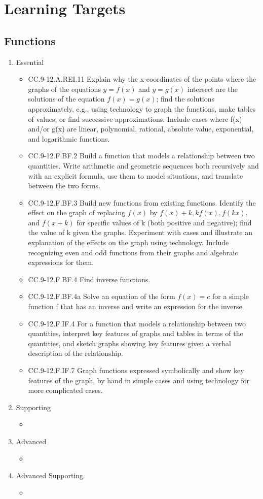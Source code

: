 \documentclass{article}
\begin{document}
\section*{Learning Targets}
\subsection*{Functions}
\begin{enumerate}
	\item Essential
	\begin{itemize}
		\item CC.9-12.A.REI.11  Explain why the x-coordinates of the points where the graphs of the equations $y = f(x)$ and $y = g(x)$ intersect are the solutions of the equation $f(x) = g(x)$; find the solutions approximately, e.g., using technology to graph the functions, make tables of values, or find successive approximations. Include cases where f(x) and/or g(x) are linear, polynomial, rational, absolute value, exponential, and logarithmic functions.
		\item CC.9-12.F.BF.2 Build a function that models a relationship between two quantities. Write arithmetic and geometric sequences both recursively and with an explicit formula, use them to model situations, and translate between the two forms.
		\item CC.9-12.F.BF.3 Build new functions from existing functions. Identify the effect on the graph of replacing $f(x)$ by $f(x) + k, k f(x), f(kx)$, and $f(x + k)$ for specific values of k (both positive and negative); find the value of k given the graphs. Experiment with cases and illustrate an explanation of the effects on the graph using technology. Include recognizing even and odd functions from their graphs and algebraic expressions for them.
		\item CC.9-12.F.BF.4  Find inverse functions. 
		\item CC.9-12.F.BF.4a Solve an equation of the form $f(x) = c$ for a simple function f that has an inverse and write an expression for the inverse. 
		\item CC.9-12.F.IF.4 For a function that models a relationship between two quantities, interpret key features of graphs and tables in terms of the quantities, and sketch graphs showing key features given a verbal description of the relationship. 
		\item CC.9-12.F.IF.7 Graph functions expressed symbolically and show key features of the graph, by hand in simple cases and using technology for more complicated cases.
	\end{itemize}		
	\item Supporting
	\begin{itemize}
		\item
	\end{itemize}
	\item Advanced
	\begin{itemize}
		\item
	\end{itemize}
	\item Advanced Supporting
	\begin{itemize}
		\item
	\end{itemize}
\end{enumerate}
\end{document}
